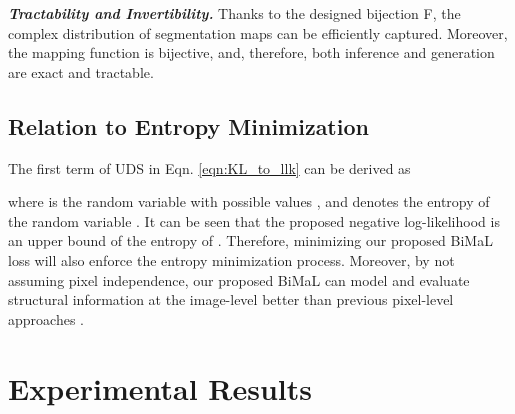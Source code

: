 \documentclass[10pt,twocolumn,letterpaper]{article}
\begin{document}
\textit{\textbf{Tractability and Invertibility.}} Thanks to the designed bijection F, the complex distribution of segmentation maps can be efficiently captured. Moreover, the mapping function is bijective, and, therefore, both inference and generation  are exact and tractable.
\subsection{Relation to Entropy Minimization} \label{sec:MLE_Entropy}
The first term of UDS in Eqn. \eqref{eqn:KL_to_llk} can be derived as

where  is the random variable with possible values , and  denotes the entropy of the random variable .
It can be seen that the proposed negative log-likelihood  is an upper bound of the entropy of . Therefore, minimizing our proposed BiMaL loss will also enforce the entropy minimization process. 
Moreover, by not assuming pixel independence, our proposed BiMaL can model and evaluate structural information at the image-level better than previous pixel-level approaches \cite{chen2019domain, pan2020unsupervised, vu2019advent}.

































































\section{Experimental Results}
\end{document}
